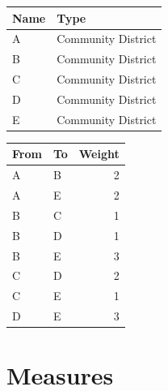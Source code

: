 \documentclass[
  letterpaper,
  DIV=11,
  numbers=noendperiod,
  oneside]{scrreprt}
\begin{document}
\begin{table}

\caption{\label{tbl-example-place-nodes}Sample place network
data}\begin{minipage}[t]{0.50\linewidth}

{\centering 

\begin{longtable}{ll}
\tabularnewline

\toprule
Name & Type \\ 
\midrule\addlinespace[2.5pt]
A & Community District \\ 
B & Community District \\ 
C & Community District \\ 
D & Community District \\ 
E & Community District \\ 
\bottomrule
\end{longtable}

}

\end{minipage}%
%
\begin{minipage}[t]{0.50\linewidth}

{\centering 

\begin{longtable}{llr}
\tabularnewline

\toprule
From & To & Weight \\ 
\midrule\addlinespace[2.5pt]
A & B & 2 \\ 
A & E & 2 \\ 
B & C & 1 \\ 
B & D & 1 \\ 
B & E & 3 \\ 
C & D & 2 \\ 
C & E & 1 \\ 
D & E & 3 \\ 
\bottomrule
\end{longtable}

}

\end{minipage}%

\end{table}

\hypertarget{measures}{%
\section{Measures}\label{measures}}
\end{document}
